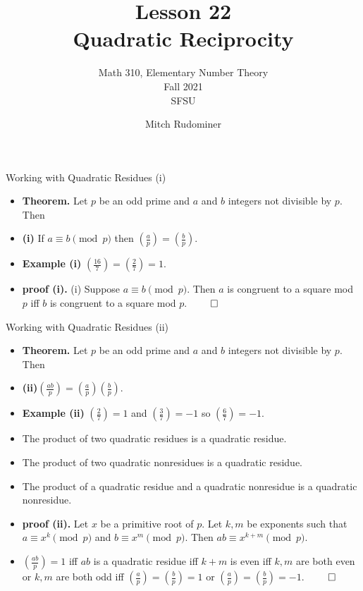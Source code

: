 \documentclass{beamer}
\title{Lesson 22 \\ Quadratic Reciprocity}
\subtitle{Math 310, Elementary Number Theory \\ Fall 2021 \\ SFSU}
\author{Mitch Rudominer}
\date{}
\begin{document}
\begin{frame}
  \titlepage
\end{frame}

\begin{frame}{Working with Quadratic Residues (i)}

\begin{itemize}
  \item \textbf{Theorem.} Let $p$ be an odd prime and $a$ and $b$ integers not divisible by $p$. Then
  \item \textbf{(i)} If $a\equiv b \pmod p$ then $(\frac{a}{p})=(\frac{b}{p})$.
  \item \textbf{Example (i)} $(\frac{16}{7}) = (\frac{2}{7}) = 1$.
  \item \textbf{proof (i).} {(i)} Suppose $a\equiv b \pmod p$. Then $a$ is congruent to a square mod $p$ iff $b$ is congruent to a square mod $p$. $\qed$
\end{itemize}
\end{frame}

\begin{frame}{Working with Quadratic Residues (ii)}

\begin{itemize}
  \item \textbf{Theorem.} Let $p$ be an odd prime and $a$ and $b$ integers not divisible by $p$. Then
  \item \textbf{(ii)}$(\frac{ab}{p})=(\frac{a}{p})(\frac{b}{p})$.
  \item \textbf{Example (ii)} $(\frac{2}{7})=1$ and $(\frac{3}{7})=-1$ so $(\frac{6}{7})=-1$.
  \item The product of two quadratic residues is a quadratic residue.
  \item The product of two quadratic nonresidues is a quadratic residue.
  \item The product of a quadratic residue and a quadratic nonresidue is a quadratic nonresidue.
  \item \textbf{proof (ii).} Let $x$ be a primitive root of $p$. Let $k,m$ be exponents such that $a\equiv x^k \pmod p$ and $b\equiv x^m \pmod p$.
  Then $ab \equiv x^{k+m} \pmod p$.
  \item $(\frac{ab}{p})=1$ iff $ab$ is a quadratic residue iff $k+m$ is even iff $k,m$ are both even
  or $k,m$ are both odd iff $(\frac{a}{p})=(\frac{b}{p}) = 1$ or $(\frac{a}{p})=(\frac{b}{p}) = -1$. $\qed$
\end{itemize}
\end{frame}
\end{document}
